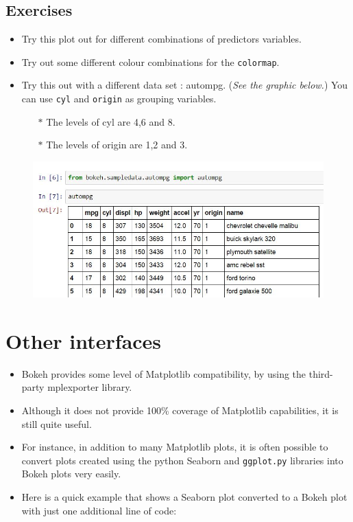 \documentclass[a4paper,12pt]{article}
\begin{document}
\subsection*{Exercises}
\begin{itemize}
	\item Try this plot out for different combinations
	of predictors variables.
	\item Try out some different colour combinations for the \texttt{colormap}.
	\item Try this out with a different data set : autompg. (\textit{See the graphic below.})  You can use \texttt{cyl} and \texttt{origin} as grouping variables. \begin{itemize}\item[$\ast$] The levels of cyl are 4,6 and 8. \item[$\ast$] The levels of origin are 1,2 and 3.
	\end{itemize}
\end{itemize}
\begin{figure}[h!]
	\centering
	\includegraphics[width=0.9\linewidth]{images/autompg}
\end{figure}

\newpage
\section*{Other interfaces}
\begin{itemize}
	
	\item Bokeh provides some level of Matplotlib compatibility, by using the third-party mplexporter library. 
	\item Although it does not provide 100\% coverage of Matplotlib capabilities, it is still quite useful. 
	\item For instance, in addition to many Matplotlib plots, it is often possible to convert plots created using the python Seaborn and \texttt{ggplot.py} libraries into Bokeh plots very easily. \item Here is a quick example that shows a Seaborn plot converted to a Bokeh plot with just one additional line of code:
\end{itemize}
\newpage
\end{document}
